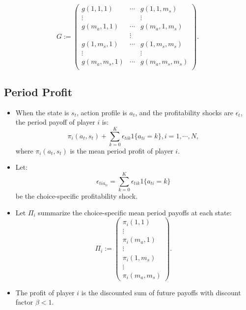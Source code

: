 \documentclass[
]{book}
\begin{document}
\begin{equation}
G := 
\begin{pmatrix}
g(1, 1, 1) & \cdots & g(1, 1, m_s)\\
\vdots & & \vdots \\
g(m_a, 1, 1) & \cdots & g(m_a, 1, m_s)\\
&\vdots& \\
g(1, m_s, 1) & \cdots & g(1, m_s, m_s)\\
\vdots & & \vdots \\
g(m_a, m_s, 1) & \cdots & g(m_a, m_s, m_s)\\
\end{pmatrix}.
\end{equation}

\hypertarget{period-profit}{%
\subsection{Period Profit}\label{period-profit}}

\begin{itemize}
\item
  When the state is \(s_t\), action profile is \(a_t\), and the profitability shocks are \(\epsilon_t\), the period payoff of player \(i\) is:
  \begin{equation}
  \pi_i(a_t, s_t) + \sum_{k = 0}^K \epsilon_{tik}1\{a_{ti} = k\}, i = 1, \cdots, N,
  \end{equation}
  where \(\pi_i(a_t, s_t)\) is the mean period profit of player \(i\).
\item
  Let:
  \[
  \epsilon_{ti a_{ti}} = \sum_{k = 0}^K \epsilon_{tik}1\{a_{ti} = k\}
  \]
  be the choice-specific profitability shock.
\item
  Let \(\Pi_i\) summarize the choice-specific mean period payoffs at each state:
  \begin{equation}
  \Pi_i :=
  \begin{pmatrix}
  \pi_i(1, 1)\\
  \vdots\\
  \pi_i(m_a, 1)\\
  \vdots\\
  \pi_i(1, m_s)\\
  \vdots\\
  \pi_i(m_a, m_s)
  \end{pmatrix}.
  \end{equation}
\item
  The profit of player \(i\) is the discounted sum of future payoffs with discount factor \(\beta < 1\).
\end{itemize}
\end{document}
